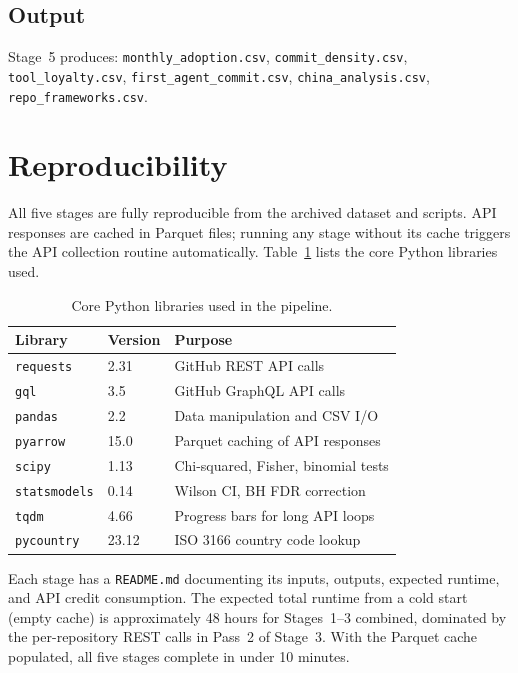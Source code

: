 \subsection{Output}

Stage~5 produces: \texttt{monthly\_adoption.csv}, \texttt{commit\_density.csv}, \texttt{tool\_loyalty.csv}, \texttt{first\_agent\_commit.csv}, \texttt{china\_analysis.csv}, \texttt{repo\_frameworks.csv}.

\section{Reproducibility}
\label{sec:impl:reproducibility}

All five stages are fully reproducible from the archived dataset and scripts. API responses are cached in Parquet files; running any stage without its cache triggers the API collection routine automatically. Table~\ref{tab:libraries} lists the core Python libraries used.

\begin{table}[h]
\centering
\caption{Core Python libraries used in the pipeline.}
\label{tab:libraries}
\begin{tabular}{@{}lll@{}}
\toprule
Library & Version & Purpose \\
\midrule
\texttt{requests}      & 2.31  & GitHub REST API calls \\
\texttt{gql}           & 3.5   & GitHub GraphQL API calls \\
\texttt{pandas}        & 2.2   & Data manipulation and CSV I/O \\
\texttt{pyarrow}       & 15.0  & Parquet caching of API responses \\
\texttt{scipy}         & 1.13  & Chi-squared, Fisher, binomial tests \\
\texttt{statsmodels}   & 0.14  & Wilson CI, BH FDR correction \\
\texttt{tqdm}          & 4.66  & Progress bars for long API loops \\
\texttt{pycountry}     & 23.12 & ISO 3166 country code lookup \\
\bottomrule
\end{tabular}
\end{table}

Each stage has a \texttt{README.md} documenting its inputs, outputs, expected runtime, and API credit consumption. The expected total runtime from a cold start (empty cache) is approximately 48 hours for Stages~1--3 combined, dominated by the per-repository REST calls in Pass~2 of Stage~3. With the Parquet cache populated, all five stages complete in under 10 minutes.
